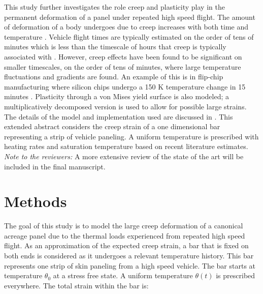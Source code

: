 \documentclass[conf]{new-aiaa}
\begin{document}
This study further investigates the role creep and plasticity play 
in the permanent deformation of a panel under repeated high speed flight.
The amount of deformation of a body undergoes due to creep increases 
with both time and temperature
\cite{roylance_mechanics_of_materials_text}. 
Vehicle flight times are typically estimated on the order
of tens of minutes 
\cite{ 
  kordes_structureal_heating_experiencs_on_the_x15_airplane,
  lafontaine_effects_of_strain_hardeing_on_response_of_skin_panels_in_hypersonic_flow,
  zuchowski_AVIATR_Predictive_capability_for_hypersonic_structural_response_and_life_prediction_phase_II}
which is less than the timescale of hours that creep is 
typically associated with 
\cite{ 
  lavina_creep_behavior_of_Ti6Al4V_from_450C_to_600C,
  evans_effects_of_alpha_case_formation_on_creep_fracture_properties_of_the_high_temperature_titanium_alloy_IMI834,
  roylance_mechanics_of_materials_text}.
However, creep effects have been found to be significant on smaller timescales,
on the order of tens of minutes,
where large temperature fluctuations and gradients are found.
An example of this is in flip-chip manufacturing 
where silicon chips undergo a 150 K temperature change 
in 15 minutes
\cite{ 
  li_simulation_of_finite_strain_inelastic_phenomena_governed_by_creep_and_plasticity}.
Plasticity through a von Mises yield surface is also modeled;
a multiplicatively decomposed version is used to allow for 
possible large strains.
The details of the model and implementation used are
discussed in 
\cite{ li_simulation_of_finite_strain_inelastic_phenomena_governed_by_creep_and_plasticity}.
This extended abstract considers the creep strain of a one dimensional bar
representing a strip of vehicle paneling.
A uniform temperature is prescribed with heating rates and saturation 
temperature based on recent literature estimates.
\newline
\newline
\noindent
\emph{Note to the reviewers:} A more extensive review of the 
state of the art will be included in the 
final manuscript.

\section{Methods} \label{sec_methods}

The goal of this study is to model the large creep deformation of a canonical acreage
panel due to the thermal loads experienced from repeated high speed flight.
As an approximation of the expected creep strain,
a bar that is fixed on both ends is considered as it 
undergoes a relevant temperature history.
This bar represents one strip of skin paneling from 
a high speed vehicle.
The bar starts at temperature $\theta_0$ at a stress free state. 
A uniform temperature $\theta(t)$ is prescribed everywhere.
The total strain within the bar is:
\end{document}
